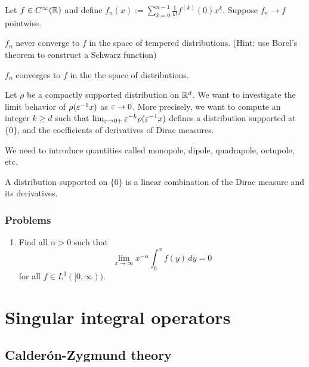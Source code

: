 \documentclass{../../large}
\begin{document}
\begin{prb}
Let $f\in C^\infty(\mathbb{R})$ and define $f_n(x):=\sum_{k=0}^{n-1}\frac1{k!}f^{(k)}(0)x^k$.
Suppose $f_n\to f$ pointwise.
\begin{parts}
\item $f_n$ never converge to $f$ in the space of tempered distributions. (Hint: use Borel's theorem to construct a Schwarz function)
\item $f_n$ converges to $f$ in the the space of distributions.
\end{parts}
\end{prb}


\begin{prb}
Let $\rho$ be a compactly supported distribution on $\mathbb{R}^d$.
We want to investigate the limit behavior of $\rho(\varepsilon^{-1}x)$ as $\varepsilon\to0$.
More precisely, we want to compute an integer $k\ge d$ such that $\lim_{\varepsilon\to0+}\varepsilon^{-k}\rho(\varepsilon^{-1}x)$ defines a distribution supported at $\{0\}$, and the coefficients of derivatives of Dirac measures.

We need to introduce quantities called monopole, dipole, quadrapole, octupole, etc.
\begin{parts}
\item A distribution supported on $\{0\}$ is a linear combination of the Dirac measure and its derivatives.
\item 
\end{parts}
\end{prb}

\section*{Problems}
\begin{enumerate}
\item Find all $\alpha>0$ such that
\[\lim_{x\to\infty}x^{-\alpha}\int_0^xf(y)\,dy=0\]
for all $f\in L^3([0,\infty))$.
\end{enumerate}


\chapter{}






\part{Singular integral operators}
\chapter{Calder\'on-Zygmund theory}
\end{document}
